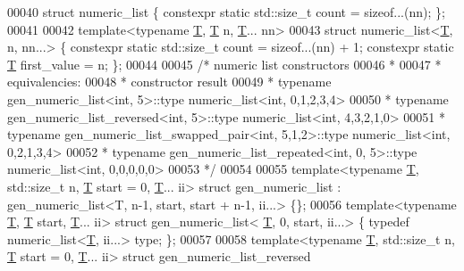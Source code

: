 \begin{DoxyCode}
00040 \textcolor{keyword}{struct }numeric\_list \{ constexpr \textcolor{keyword}{static} std::size\_t count = \textcolor{keyword}{sizeof}...(nn); \};
00041 
00042 \textcolor{keyword}{template}<\textcolor{keyword}{typename} \hyperlink{group___sparse_core___module_class_eigen_1_1_triplet}{T}, \hyperlink{group___sparse_core___module_class_eigen_1_1_triplet}{T} n, \hyperlink{group___sparse_core___module_class_eigen_1_1_triplet}{T}... nn>
00043 \textcolor{keyword}{struct }numeric\_list<\hyperlink{group___sparse_core___module_class_eigen_1_1_triplet}{T}, n, nn...> \{ constexpr \textcolor{keyword}{static} std::size\_t count = \textcolor{keyword}{sizeof}...(nn) + 1; constexpr \textcolor{keyword}{
      static} \hyperlink{group___sparse_core___module_class_eigen_1_1_triplet}{T} first\_value = n; \};
00044 
00045 \textcolor{comment}{/* numeric list constructors}
00046 \textcolor{comment}{ *}
00047 \textcolor{comment}{ * equivalencies:}
00048 \textcolor{comment}{ *     constructor                                              result}
00049 \textcolor{comment}{ *     typename gen\_numeric\_list<int, 5>::type                  numeric\_list<int, 0,1,2,3,4>}
00050 \textcolor{comment}{ *     typename gen\_numeric\_list\_reversed<int, 5>::type         numeric\_list<int, 4,3,2,1,0>}
00051 \textcolor{comment}{ *     typename gen\_numeric\_list\_swapped\_pair<int, 5,1,2>::type numeric\_list<int, 0,2,1,3,4>}
00052 \textcolor{comment}{ *     typename gen\_numeric\_list\_repeated<int, 0, 5>::type      numeric\_list<int, 0,0,0,0,0>}
00053 \textcolor{comment}{ */}
00054 
00055 \textcolor{keyword}{template}<\textcolor{keyword}{typename} \hyperlink{group___sparse_core___module_class_eigen_1_1_triplet}{T}, std::size\_t n, \hyperlink{group___sparse_core___module_class_eigen_1_1_triplet}{T} start = 0, \hyperlink{group___sparse_core___module_class_eigen_1_1_triplet}{T}... ii> \textcolor{keyword}{struct }gen\_numeric\_list                     : 
      gen\_numeric\_list<T, n-1, start, start + n-1, ii...> \{\};
00056 \textcolor{keyword}{template}<\textcolor{keyword}{typename} \hyperlink{group___sparse_core___module_class_eigen_1_1_triplet}{T}, \hyperlink{group___sparse_core___module_class_eigen_1_1_triplet}{T} start, \hyperlink{group___sparse_core___module_class_eigen_1_1_triplet}{T}... ii>                    \textcolor{keyword}{struct }gen\_numeric\_list<
      \hyperlink{group___sparse_core___module_class_eigen_1_1_triplet}{T}, 0, start, ii...> \{ \textcolor{keyword}{typedef} numeric\_list<\hyperlink{group___sparse_core___module_class_eigen_1_1_triplet}{T}, ii...> type; \};
00057 
00058 \textcolor{keyword}{template}<\textcolor{keyword}{typename} \hyperlink{group___sparse_core___module_class_eigen_1_1_triplet}{T}, std::size\_t n, \hyperlink{group___sparse_core___module_class_eigen_1_1_triplet}{T} start = 0, \hyperlink{group___sparse_core___module_class_eigen_1_1_triplet}{T}... ii> \textcolor{keyword}{struct }gen\_numeric\_list\_reversed              

\end{DoxyCode}
